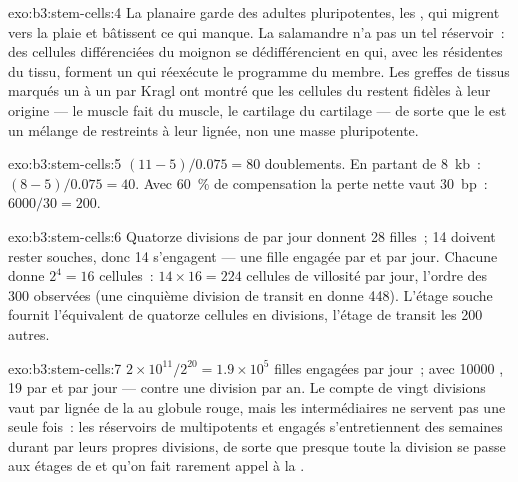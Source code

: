 \begin{solution}{exo:b3:stem-cells:4}
La planaire garde des  adultes pluripotentes, les
, qui migrent vers la plaie et bâtissent ce qui manque. La
salamandre n'a pas un tel réservoir~: des cellules différenciées du
moignon se dédifférencient en  qui, avec les  résidentes du tissu, forment un  qui réexécute le
programme du membre. Les greffes de tissus marqués un à un par Kragl ont
montré que les cellules du  restent fidèles à leur origine ---
le muscle fait du muscle, le cartilage du cartilage --- de sorte que le
 est un mélange de  restreints à leur lignée, non
une masse pluripotente.
\end{solution}

\begin{solution}{exo:b3:stem-cells:5}
$(11 - 5)/0.075 = 80$ doublements. En partant de \qty{8}{kb}~:
$(8 - 5)/0.075 = 40$. Avec \qty{60}{\%} de compensation la perte nette
vaut \qty{30}{bp}~: $6000/30
= 200$.
\end{solution}

\begin{solution}{exo:b3:stem-cells:6}
Quatorze divisions de  par jour donnent 28 filles~; 14
doivent rester souches, donc 14 s'engagent --- une fille engagée par
 et par jour. Chacune donne $2^{4} = 16$ cellules~:
$14\times 16 = 224$ cellules de villosité par jour, l'ordre des
\num{300} observées (une cinquième division de transit en donne
\num{448}). L'étage souche fournit l'équivalent de quatorze cellules en
divisions, l'étage de transit les \num{200} autres.
\end{solution}

\begin{solution}{exo:b3:stem-cells:7}
$2\times 10^{11}/2^{20} = 1.9\times 10^{5}$ filles engagées par jour~;
avec \num{10000} , 19 par  et par jour ---
contre une division par an. Le compte de vingt divisions vaut par lignée
de la  au globule rouge, mais les 
intermédiaires ne servent pas une seule fois~: les réservoirs de
 multipotents et engagés s'entretiennent des semaines durant
par leurs propres divisions, de sorte que presque toute la division se
passe aux étages de  et qu'on fait rarement appel à la
.
\end{solution}

